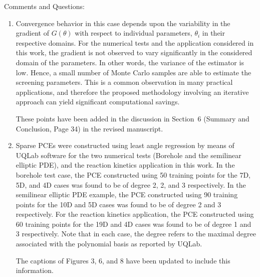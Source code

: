 \documentclass[11pt,final]{article}
\newcommand{\referee}[1]{\vspace{.1ex}\noindent{\textcolor{blue}{#1}}}
\begin{document}
Comments and Questions:
\begin{enumerate}

\item \referee{P16, Figure.2,  the estimated screening parameters eq (5) based on eq(1)
quickly converge with a small number of samples (5-10 samples). It seems that
if $\mu_i$ is based on eq(1), it will still require a reasonable amount of
samples, can authors comment on why this example converges with a small number
of samples? The same question applies to Figure 5 and Figure 7.}

Convergence behavior in this case depends upon the variability in the gradient of
$G(\theta)$ with respect to individual parameters, $\theta_i$ in their respective
domains. For the numerical tests and the application considered in this work, the
gradient is not observed to vary significantly in the considered domain of the
parameters. In other words, the variance of the estimator is low. 
Hence, a small number of Monte Carlo samples are able to estimate
the screening parameters. This is a common observation in many practical
applications, and therefore the proposed methodology involving an iterative
approach can yield significant computational savings. 

These points have been added in the discussion in Section~6 (Summary and
Conclusion, Page 34) in the revised manuscript. 

\item 
\referee{P17, Figure 3, what's the degree of the PCE used in the example? The same
question applies to Figure 6 and Figure 8.}

Sparse PCEs were constructed using least angle regression by means of UQLab software
for the two numerical tests (Borehole and the semilinear elliptic PDE),
and the reaction kinetics application in this work.  
In the borehole test case, the PCE constructed using 50 training points for the 7D, 5D, and
4D cases was found to be of degree 2, 2, and 3 respectively.  
In the semilinear elliptic PDE example, the PCE constructed using 90 training
points for the 10D and 5D cases was found to be of degree 2 and 3 respectively.
For the reaction kinetics application, the PCE constructed using 60 training points
for the 19D and 4D cases was found to be of degree 1 and 3 respectively. Note that
in each case, the degree refers to the maximal degree associated with the polynomial
basis as reported by UQLab. 

The captions of Figures 3, 6, and 8 have been updated to include this information. 


\end{enumerate}
\end{document}
